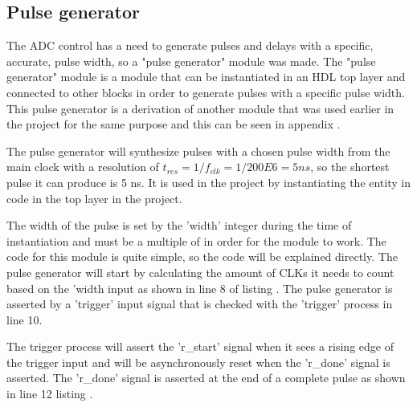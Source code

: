 \subsection{Pulse generator} \label{subsec:Pulse_Generator} 

The ADC control has a need to generate pulses and delays with a specific, accurate, pulse width, so a "pulse generator" module was made. The "pulse generator" module is a module that can be instantiated in an HDL top layer and connected to other blocks in order to generate pulses with a specific pulse width. This pulse generator is a derivation of another module that was used earlier in the project for the same purpose and this can be seen in appendix .

The pulse generator will synthesize pulses with a chosen pulse width from the main  clock with a resolution of $t_{res} = 1/f_{clk} = 1/200E6 = 5ns$, so the shortest pulse it can produce is 5 ns. It is used in the project by instantiating the entity in code  in the top layer in the project.



The width of the pulse is set by the 'width' integer during the time of instantiation and must be a multiple of  in order for the module to work. The code for this module is quite simple, so the code will be explained directly. The pulse generator will start by calculating the amount of CLKs it needs to count based on the 'width input as shown in line 8 of listing .  The pulse generator is asserted by a 'trigger' input signal that is checked with the 'trigger' process in line 10.



The trigger process will assert the 'r\_start' signal when it sees a rising edge of the trigger input and will be asynchronously reset when the 'r\_done' signal is asserted. The 'r\_done' signal is asserted at the end of a complete pulse as shown in line 12 listing .

